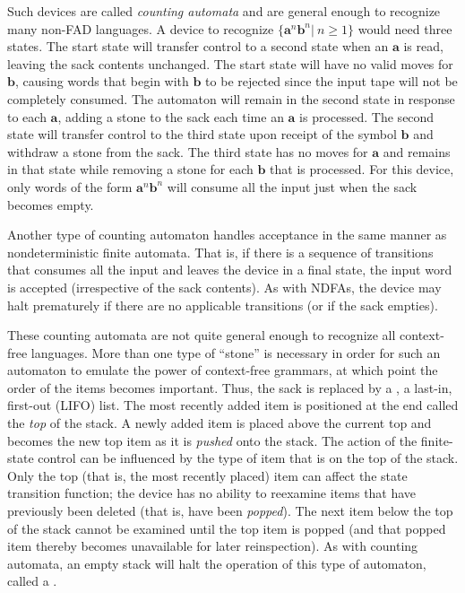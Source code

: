 Such devices are called \emph{counting automata} and are general enough
to recognize many non-FAD languages. A device to recognize $\{\pmb{a}^n\pmb{b}^n
|\ n \geq 1\}$ would need three states. The start state will transfer control to a
second state when an $\pmb{a}$ is read, leaving the sack contents unchanged. The
start state will have no valid moves for $\pmb{b}$, causing words that begin with
$\pmb{b}$ to be rejected since the input tape will not be completely consumed. The
automaton will remain in the second state in response to each $\pmb{a}$, adding a
stone to the sack each time an $\pmb{a}$ is processed. The second state will
transfer control to the third state upon receipt of the symbol $\pmb{b}$ and
withdraw a stone from the sack. The third state has no moves for $\pmb{a}$ and
remains in that state while removing a stone for each $\pmb{b}$ that is processed.
For this device, only words of the form $\pmb{a}^n\pmb{b}^n$ will consume all
the input just when the sack becomes empty.

Another type of counting automaton handles acceptance in the same manner as
nondeterministic finite automata. That is, if there is a sequence of transitions
that consumes all the input and leaves the device in a final state, the input
word is accepted (irrespective of the sack contents). As with NDFAs, the device
may halt prematurely if there are no applicable transitions (or if the sack
empties).

These counting automata are not quite general enough to recognize all
context-free languages. More than one type of ``stone'' is necessary in order
for such an automaton to emulate the power of context-free grammars, at which
point the order of the items becomes important. Thus, the sack is replaced by a
\emph{}, a last-in, first-out (LIFO) list. The most recently added
item is positioned at the end called the \emph{top} of the stack. A newly added
item is placed above the current top and becomes the new top item as it is
\emph{pushed} onto the stack. The action of the finite-state control can be
influenced by the type of item that is on the top of the stack. Only the top
(that is, the most recently placed) item can affect the state transition
function; the device has no ability to reexamine items that have previously
been deleted (that is, have been \emph{popped}). The next item below the top of
the stack cannot be examined until the top item is popped (and that popped item
thereby becomes unavailable for later reinspection). As with counting automata,
an empty stack will halt the operation of this type of automaton, called a
\emph{}.

